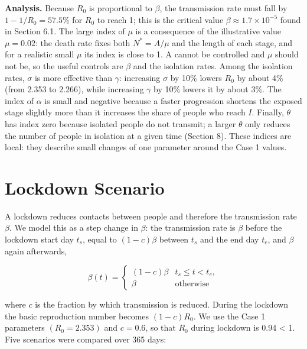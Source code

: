 \documentclass[12pt,a4paper]{article}
\theoremstyle{definition}
\begin{document}
\textbf{Analysis. }Because $R_{0}$ is proportional to $\beta$, the transmission rate must fall by $1 - 1/R_{0} = 57.5\%$ for $R_{0}$ to reach 1; this is the critical value $\beta \approx 1.7 \times 10^{-5}$ found in Section 6.1. The large index of $\mu$ is a consequence of the illustrative value $\mu = 0.02$: the death rate fixes both $N^* = A/\mu$ and the length of each stage, and for a realistic small $\mu$ its index is close to \textminus{}1. A cannot be controlled and $\mu$ should not be, so the useful controls are $\beta$ and the isolation rates. Among the isolation rates, $\sigma$ is more effective than $\gamma$: increasing $\sigma$ by 10\% lowers $R_{0}$ by about 4\% (from 2.353 to 2.266), while increasing $\gamma$ by 10\% lowers it by about 3\%. The index of $\alpha$ is small and negative because a faster progression shortens the exposed stage slightly more than it increases the share of people who reach $I$. Finally, $\theta$ has index zero because isolated people do not transmit; a larger $\theta$ only reduces the number of people in isolation at a given time (Section 8). These indices are local: they describe small changes of one parameter around the Case 1 values.


\section{Lockdown Scenario}

A lockdown reduces contacts between people and therefore the transmission rate $\beta$. We model this as a step change in $\beta$: the transmission rate is $\beta$ before the lockdown start day $t_{s}$, equal to $(1 - c)\beta$ between $t_{s}$ and the end day $t_{e}$, and $\beta$ again afterwards,


\begin{equation}
\beta(t) = \begin{cases}(1-c)\beta & t_s \le t < t_e,\\ \beta & \text{otherwise}\end{cases}
\end{equation}

where $c$ is the fraction by which transmission is reduced. During the lockdown the basic reproduction number becomes $(1 - c)R_{0}$. We use the Case 1 parameters $(R_{0} = 2.353)$ and $c = 0.6$, so that $R_{0}$ during lockdown is 0.94 < 1. Five scenarios were compared over 365 days:
\end{document}
